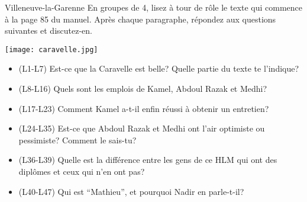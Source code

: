 \begin{frame}{Villeneuve-la-Garenne}
  \footnotesize
  En groupes de 4, lisez à tour de rôle  le texte qui commence à la page 85 du manuel.
  Après chaque paragraphe, répondez aux questions suivantes et discutez-en.
  \begin{center}
    \texttt{[image: caravelle.jpg]}
  \end{center}
  \begin{itemize}
    \item (L1-L7) Est-ce que la Caravelle est belle? Quelle partie du texte te l'indique?
    \item (L8-L16) Quels sont les emplois de Kamel, Abdoul Razak et Medhi?
    \item (L17-L23) Comment Kamel a-t-il enfin réussi à obtenir un entretien?
    \item (L24-L35) Est-ce que Abdoul Razak et Medhi ont l'air optimiste ou pessimiste? Comment le sais-tu?
    \item (L36-L39) Quelle est la différence entre les gens de ce HLM qui ont des diplômes et ceux qui n'en ont pas?
    \item (L40-L47) Qui est ``Mathieu'', et pourquoi Nadir en parle-t-il?
  \end{itemize}
\end{frame}